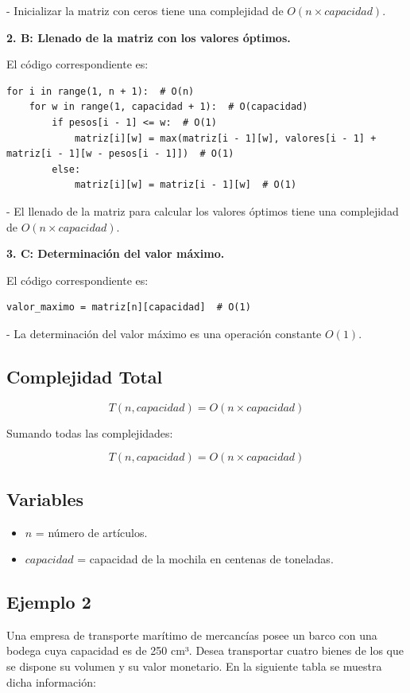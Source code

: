 - Inicializar la matriz con ceros tiene una complejidad de \( O(n \times capacidad) \).

\textbf{2. B: Llenado de la matriz con los valores óptimos.}

El código correspondiente es:
\begin{lstlisting}
for i in range(1, n + 1):  # O(n)
    for w in range(1, capacidad + 1):  # O(capacidad)
        if pesos[i - 1] <= w:  # O(1)
            matriz[i][w] = max(matriz[i - 1][w], valores[i - 1] + matriz[i - 1][w - pesos[i - 1]])  # O(1)
        else:
            matriz[i][w] = matriz[i - 1][w]  # O(1)
\end{lstlisting}

- El llenado de la matriz para calcular los valores óptimos tiene una complejidad de \( O(n \times capacidad) \).

\textbf{3. C: Determinación del valor máximo.}

El código correspondiente es:
\begin{lstlisting}
valor_maximo = matriz[n][capacidad]  # O(1)
\end{lstlisting}

- La determinación del valor máximo es una operación constante \( O(1) \).

\subsection*{Complejidad Total}

\[
T(n, capacidad) = O(n \times capacidad)
\]

Sumando todas las complejidades:

\[
T(n, capacidad) = O(n \times capacidad)
\]

\subsection*{Variables}

\begin{itemize}
    \item \( n \) = número de artículos.
    \item \( capacidad \) = capacidad de la mochila en centenas de toneladas.
\end{itemize}

\subsection{Ejemplo 2}
Una empresa de transporte marítimo de mercancías posee un barco con una bodega cuya capacidad es de 250 cm³. Desea transportar cuatro bienes de los que se dispone su volumen y su valor monetario. En la siguiente tabla se muestra dicha información:

